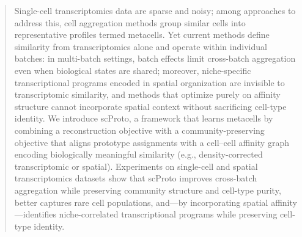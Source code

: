 \begin{abstract}
Single-cell transcriptomics data are sparse and noisy; among approaches to address this, cell aggregation methods group similar cells into representative profiles termed metacells. Yet current methods define similarity from transcriptomics alone and operate within individual batches: in multi-batch settings, batch effects limit cross-batch aggregation even when biological states are shared; moreover, niche-specific transcriptional programs encoded in spatial organization are invisible to transcriptomic similarity, and methods that optimize purely on affinity structure cannot incorporate spatial context without sacrificing cell-type identity. We introduce scProto, a framework that learns metacells by combining a reconstruction objective with a community-preserving objective that aligns prototype assignments with a cell--cell affinity graph encoding biologically meaningful similarity (e.g., density-corrected transcriptomic or spatial). Experiments on single-cell and spatial transcriptomics datasets show that scProto improves cross-batch aggregation while preserving community structure and cell-type purity, better captures rare cell populations, and---by incorporating spatial affinity---identifies niche-correlated transcriptional programs while preserving cell-type identity.
\end{abstract}
